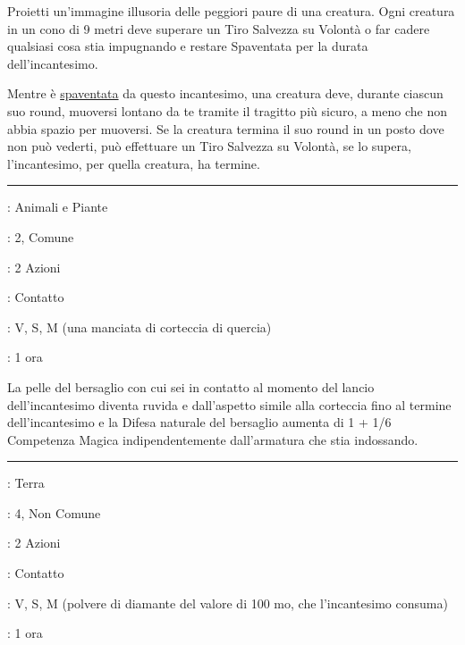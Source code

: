 \begin{multicols}{2}
Proietti un'immagine illusoria delle peggiori paure di una creatura. Ogni creatura in un cono di 9 metri deve superare un Tiro Salvezza su Volontà o far cadere qualsiasi cosa stia impugnando e restare Spaventata per la durata dell'incantesimo.

Mentre è \hyperlink{condizionepaura}{spaventata} da questo incantesimo, una creatura deve, durante ciascun suo round, muoversi lontano da te tramite il tragitto più sicuro, a meno che non abbia spazio per muoversi. Se la creatura termina il suo round in un posto dove non può vederti, può effettuare un Tiro Salvezza su Volontà, se lo supera, l'incantesimo, per quella creatura, ha termine.

\smallskip\noindent\rule{\linewidth}{2pt} \hypertarget{Pelle di Corteccia}{}\smallskip{}
\noindent
\begin{description}[noitemsep, topsep=0pt, parsep=0pt, partopsep=0pt, leftmargin=0cm, labelwidth=2.8cm]
	\item[\textbf{Lista di Magia}]: Animali e Piante
	\item[\textbf{Livello}]: 2, Comune
	\item[\textbf{T. di Lancio}]: 2 Azioni
	\item[\textbf{Gittata}]: Contatto
	\item[\textbf{Componenti}]: V, S, M (una manciata di corteccia di quercia)
	\item[\textbf{Durata}]: 1 ora
\end{description}

La pelle del bersaglio con cui sei in contatto al momento del lancio dell'incantesimo diventa ruvida e dall'aspetto simile alla corteccia fino al termine dell'incantesimo e la Difesa naturale del bersaglio aumenta di 1 + 1/6 Competenza Magica indipendentemente dall'armatura che stia indossando.

\smallskip\noindent\rule{\linewidth}{2pt} \hypertarget{Pelle di Pietra}{}\smallskip{}
\noindent
\begin{description}[noitemsep, topsep=0pt, parsep=0pt, partopsep=0pt, leftmargin=0cm, labelwidth=2.8cm]
	\item[\textbf{Lista di Magia}]: Terra
	\item[\textbf{Livello}]: 4, Non Comune
	\item[\textbf{T. di Lancio}]: 2 Azioni
	\item[\textbf{Gittata}]: Contatto
	\item[\textbf{Componenti}]: V, S, M (polvere di diamante del valore di 100 mo, che l'incantesimo consuma)
	\item[\textbf{Durata}]: 1 ora
\end{description}


\end{multicols}
